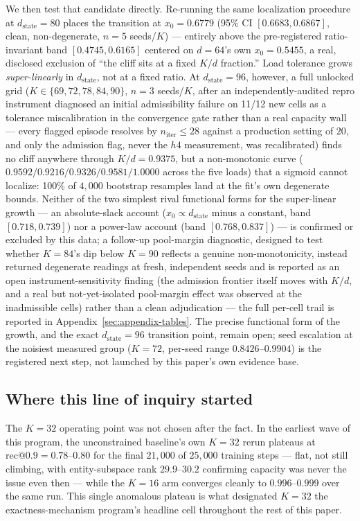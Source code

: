 We then test that candidate directly. Re-running the same localization
procedure at $d_{\mathrm{state}}{=}80$ places the transition at
$x_0{=}0.6779$ (95\% CI $[0.6683,0.6867]$, clean, non-degenerate,
$n{=}5$ seeds/$K$) --- entirely above the pre-registered ratio-invariant
band $[0.4745,0.6165]$ centered on $d{=}64$'s own $x_0{=}0.5455$, a real,
disclosed exclusion of ``the cliff sits at a fixed $K/d$ fraction.'' Load
tolerance grows \emph{super-linearly} in $d_{\mathrm{state}}$, not at a
fixed ratio. At $d_{\mathrm{state}}{=}96$, however, a full unlocked grid
($K\in\{69,72,78,84,90\}$, $n{=}3$ seeds/$K$, after an
independently-audited repro instrument diagnosed an initial admissibility
failure on 11/12 new cells as a tolerance miscalibration in the
convergence gate rather than a real capacity wall --- every flagged
episode resolves by $n_{\mathrm{iter}}\leq28$ against a production
setting of $20$, and only the admission flag, never the $h4$ measurement,
was recalibrated) finds no cliff anywhere through $K/d{=}0.9375$, but a
non-monotonic curve ($0.9592/0.9216/0.9326/0.9581/1.0000$ across the five
loads) that a sigmoid cannot localize: 100\% of $4{,}000$ bootstrap
resamples land at the fit's own degenerate bounds. Neither of the two
simplest rival functional forms for the super-linear growth --- an
absolute-slack account ($x_0\propto d_{\mathrm{state}}$ minus a constant,
band $[0.718,0.739]$) nor a power-law account (band $[0.768,0.837]$) ---
is confirmed or excluded by this data; a follow-up pool-margin
diagnostic, designed to test whether $K{=}84$'s dip below $K{=}90$
reflects a genuine non-monotonicity, instead returned degenerate readings
at fresh, independent seeds and is reported as an open
instrument-sensitivity finding (the admission frontier itself moves with
$K/d$, and a real but not-yet-isolated pool-margin effect was observed at
the inadmissible cells) rather than a clean adjudication --- the full
per-cell trail is reported in Appendix~\ref{sec:appendix-tables}. The
precise functional form of the growth, and the exact
$d_{\mathrm{state}}{=}96$ transition point, remain open; seed escalation
at the noisiest measured group ($K{=}72$, per-seed range
$0.8426$--$0.9904$) is the registered next step, not launched by this
paper's own evidence base.

\subsection{Where this line of inquiry started}

The $K{=}32$ operating point was not chosen after the fact. In the
earliest wave of this program, the unconstrained baseline's own $K{=}32$
rerun plateaus at $\mathrm{rec@0.9}=0.78$--$0.80$ for the final
$21{,}000$ of $25{,}000$ training steps --- flat, not still climbing, with
entity-subspace rank $29.9$--$30.2$ confirming capacity was never the
issue even then --- while the $K{=}16$ arm converges cleanly to
$0.996$--$0.999$ over the same run. This single anomalous plateau is what
designated $K{=}32$ the exactness-mechanism program's headline cell
throughout the rest of this paper.

